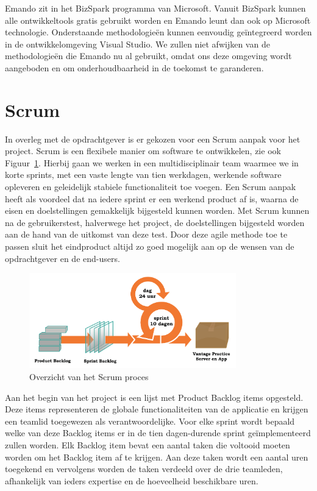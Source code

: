 Emando zit in het BizSpark programma van Microsoft. Vanuit BizSpark kunnen alle ontwikkeltools gratis gebruikt worden en Emando leunt dan ook op Microsoft technologie. Onderstaande methodologieën kunnen eenvoudig geïntegreerd worden in de ontwikkelomgeving Visual Studio. We zullen niet afwijken van de methodologieën die Emando nu al gebruikt, omdat ons deze omgeving wordt aangeboden en om onderhoudbaarheid in de toekomst te garanderen.

\section{Scrum}
In overleg met de opdrachtgever is er gekozen voor een Scrum aanpak voor het project. Scrum is een flexibele manier om software te ontwikkelen, zie ook Figuur~\ref{fig:scrum-proces}. Hierbij gaan we werken in een multidisciplinair team waarmee we in korte sprints, met een vaste lengte van tien werkdagen, werkende software opleveren en geleidelijk stabiele functionaliteit toe voegen. Een Scrum aanpak heeft als voordeel dat na iedere sprint er een werkend product af is, waarna de eisen en doelstellingen gemakkelijk bijgesteld kunnen worden. Met Scrum kunnen na de gebruikerstest, halverwege het project, de doelstellingen bijgesteld worden aan de hand van de uitkomst van deze test. Door deze agile methode toe te passen sluit het eindproduct altijd zo goed mogelijk aan op de wensen van de opdrachtgever en de end-users.

\begin{figure}[H]
  \begin{center}
    \includegraphics[width=0.8\textwidth]{style/images/Scrum}
  \end{center}
  \caption{Overzicht van het Scrum proces}
  \label{fig:scrum-proces}
\end{figure}

Aan het begin van het project is een lijst met Product Backlog items opgesteld. Deze items representeren de globale functionaliteiten van de applicatie en krijgen een teamlid toegewezen als verantwoordelijke. Voor elke sprint wordt bepaald welke van deze Backlog items er in de tien dagen-durende sprint geïmplementeerd zullen worden. Elk Backlog item bevat een aantal taken die voltooid moeten worden om het Backlog item af te krijgen. Aan deze taken wordt een aantal uren toegekend en vervolgens worden de taken verdeeld over de drie teamleden, afhankelijk van ieders expertise en de hoeveelheid beschikbare uren.

